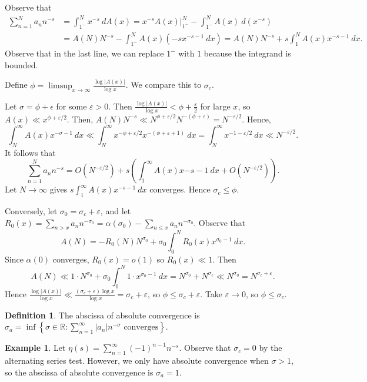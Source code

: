 \documentclass[11pt]{article}
\theoremstyle{definition}
\newtheorem{defn}[thm]{Definition}
\newtheorem{example}[thm]{Example}
\newcommand{\set}[1]{\left\{ #1 \right\}}
\newcommand{\s}[0]{\sigma}
\newcommand{\e}[0]{\varepsilon}
\newcommand{\abs}[1]{\left\lvert#1\right\rvert} %
\newcommand{\RR}{\mathbb{R}}
\begin{document}
\proof
Observe that
\begin{align*}
  \sum_{n=1}^N a_nn^{-s} &= \int_{1^-}^N x^{-s} ~dA(x)
  = \left.x^{-s}A(x)\right|_{1^-}^N - \int_{1^-}^N A(x) ~d(x^{-s}) \\
  &= A(N)N^{-s} - \int_{1^-}^N A(x)(-sx^{-s-1} ~dx)
  = A(N)N^{-s} + s\int_1^N A(x) x^{-s-1} ~dx .
\end{align*}
Observe that in the last line, we can replace $1^-$ with $1$ because the integrand is
bounded.

Define $\phi=\limsup_{x\to\infty}\frac{\log\abs{A(x)}}{\log x}$. We compare this to $\s_c$.

Let $\s=\phi+\epsilon$ for some $\e>0$. Then $\frac{\log\abs{A(x)}}{\log x}<\phi+\frac\e2$
for large $x$, so $A(x)\ll x^{\phi+\e/2}$. Then, $A(N)N^{-s}\ll N^{\phi+\e/2}N^{-(\phi+\e)}
= N^{-\e/2}$. Hence,
\[
  \int_N^\infty A(x)x^{-\s-1} ~dx \ll \int_N^\infty x^{-\phi+\e/2}x^{-(\phi+\e+1)} ~dx
  = \int_N^\infty x^{-1-\e/2} ~dx \ll N^{-\e/2} .
\]
It follows that
\[
  \sum_{n=1}^N a_nn^{-s}
  = O(N^{-\e/2}) + s\left(\int_1^\infty A(x)x{-s-1} ~dx + O(N^{-\e/2})\right) .
\]
Let $N\to\infty$ gives $s\int_1^\infty A(x)x^{-s-1} ~dx$ converges. Hence
$\sigma_c\le\phi$.

Conversely, let $\s_0=\s_c+\e$, and let
$R_0(x)=\sum_{n>x}a_nn^{-\s_0}=\alpha(\s_0)-\sum_{n\le x}a_nn^{-\s_0}$. Observe that
\[
  A(N) = -R_0(N)N^{\s_0} + \s_0\int_0^NR_0(x)x^{\s_0-1} ~dx .
\]
Since $\alpha(0)$ converges, $R_0(x)=o(1)$ so $R_0(x)\ll1$. Then
\[
  A(N) \ll 1 \cdot N^{\s_0} + \s_0\int_0^N 1\cdot x^{\s_0-1} ~dx
  = N^{\s_0}+N^{\s_c} \ll N^{\s_0} = N^{\s_c+\e} .
\]
Hence $\frac{\log\abs{A(x)}}{\log x} \ll \frac{(\s_c+\e)\log x}{\log x} = \s_c+\e$, so
$\phi\le\s_c+\e$. Take $\e\to0$, so $\phi\le\s_c$.
\qedhere



\begin{defn}
The abscissa of absolute convergence is
$\s_a=\inf\set{\s\in\RR:\sum_{n=1}^\infty\abs{a_n}n^{-\s}\text{ converges}}$.
\end{defn}

\begin{example}
Let $\eta(s)=\sum_{n=1}^\infty(-1)^{n-1}n^{-s}$. Observe that $\s_c=0$ by the alternating
series test. However, we only have absolute convergence when $\s>1$, so the abscissa of
absolute convergence is $\s_a=1$.
\end{example}
\end{document}
